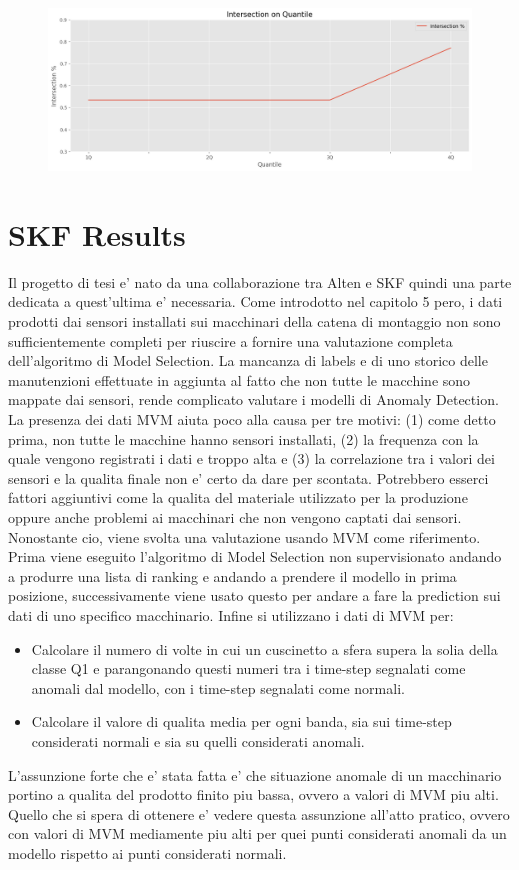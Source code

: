 \begin{figure}[t]
\includegraphics[width=14cm, scale=1]{images/4quantile}
\centering
\end{figure}



\section{SKF Results}
Il progetto di tesi e' nato da una collaborazione tra Alten e SKF quindi una parte dedicata a quest'ultima e' necessaria. Come introdotto nel capitolo 5 pero, i dati prodotti dai sensori installati sui macchinari della catena di montaggio non sono sufficientemente completi per riuscire a fornire una valutazione completa dell'algoritmo di Model Selection. La mancanza di labels e di uno storico delle manutenzioni effettuate in aggiunta al fatto che non tutte le macchine sono mappate dai sensori, rende complicato valutare i modelli di Anomaly Detection. La presenza dei dati MVM aiuta poco alla causa per tre motivi: (1) come detto prima, non tutte le macchine hanno sensori installati, (2) la frequenza con la quale vengono registrati i dati e troppo alta e (3) la correlazione tra i valori dei sensori e la qualita finale non e' certo da dare per scontata. Potrebbero esserci fattori aggiuntivi come la qualita del materiale utilizzato per la produzione oppure anche problemi ai macchinari che non vengono captati dai sensori. 
Nonostante cio, viene svolta una valutazione usando MVM come riferimento. Prima viene eseguito l'algoritmo di Model Selection non supervisionato andando a produrre una lista di ranking e andando a prendere il modello in prima posizione, successivamente viene usato questo per andare a fare la prediction sui dati di uno specifico macchinario. Infine si utilizzano i dati di MVM per:
\begin{itemize}
\item Calcolare il numero di volte in cui un cuscinetto a sfera supera la solia della classe Q1 e parangonando questi numeri tra i time-step segnalati come anomali dal modello, con i time-step segnalati come normali.
\item Calcolare il valore di qualita media per ogni banda, sia sui time-step considerati normali e sia su quelli considerati anomali.
\end{itemize}
L'assunzione forte che e' stata fatta e' che situazione anomale di un macchinario portino a qualita del prodotto finito piu bassa, ovvero a valori di MVM piu alti. Quello che si spera di ottenere e' vedere questa assunzione all'atto pratico, ovvero con valori di MVM mediamente piu alti per quei punti considerati anomali da un modello rispetto ai punti considerati normali.


